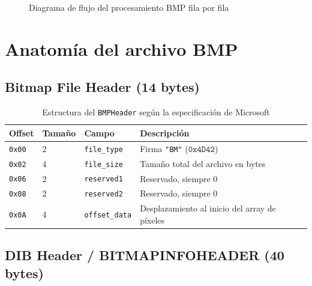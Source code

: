 \documentclass[12pt, letterpaper]{article}
\begin{document}
\begin{figure}[H]
{
    }
    \caption{Diagrama de flujo del procesamiento BMP fila por fila}
\end{figure}

\section{Anatomía del archivo BMP}

\subsection{Bitmap File Header (14 bytes)}

\begin{table}[H]
    \centering
    \begin{tabular}{@{}lllp{6cm}@{}}
        \toprule
        \textbf{Offset} & \textbf{Tamaño} & \textbf{Campo} & \textbf{Descripción} \\
        \midrule
        \texttt{0x00} & 2 & \texttt{file\_type}   & Firma \texttt{"BM"} ($\texttt{0x4D42}$) \\
        \texttt{0x02} & 4 & \texttt{file\_size}   & Tamaño total del archivo en bytes \\
        \texttt{0x06} & 2 & \texttt{reserved1}    & Reservado, siempre 0 \\
        \texttt{0x08} & 2 & \texttt{reserved2}    & Reservado, siempre 0 \\
        \texttt{0x0A} & 4 & \texttt{offset\_data} & Desplazamiento al inicio del array de píxeles \\
        \bottomrule
    \end{tabular}
    \caption{Estructura del \texttt{BMPHeader} según la especificación de Microsoft \cite{microsoft_bmp}}
\end{table}

\subsection{DIB Header / BITMAPINFOHEADER (40 bytes)}
\end{document}
